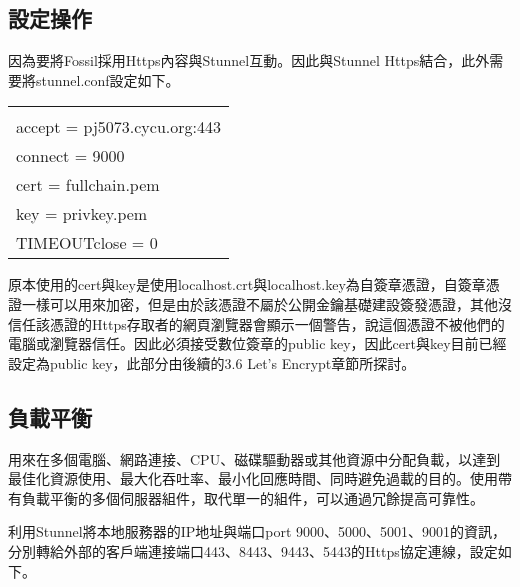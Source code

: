 \renewcommand{\baselinestretch}{20} %
\subsection{設定操作}
\par
\renewcommand{\baselinestretch}{1} %
\twelve \qquad 因為要將Fossil採用Https內容與Stunnel互動。因此與Stunnel Https結合，此外需要將stunnel.conf設定如下。
\\
\par
\begin{center}
\begin{tabular}{||p{15cm}|} %
\hline
[https]
\\
accept = pj5073.cycu.org:443
\\
connect = 9000
\\
cert = fullchain.pem
\\
key = privkey.pem
\\
TIMEOUTclose = 0
\\
\hline
\end{tabular}
\end{center}
\par
\renewcommand{\baselinestretch}{1} %
\twelve \hspace{0.5em} 原本使用的cert與key是使用localhost.crt與localhost.key為自簽章憑證，自簽章憑證一樣可以用來加密，但是由於該憑證不屬於公開金鑰基礎建設簽發憑證，其他沒信任該憑證的Https存取者的網頁瀏覽器會顯示一個警告，說這個憑證不被他們的電腦或瀏覽器信任。因此必須接受數位簽章的public key，因此cert與key目前已經設定為public key，此部分由後續的3.6 Let's Encrypt章節所探討。
\par

\renewcommand{\baselinestretch}{20} %
\subsection{負載平衡}
\par
\renewcommand{\baselinestretch}{1} %
\twelve \qquad 用來在多個電腦、網路連接、CPU、磁碟驅動器或其他資源中分配負載，以達到最佳化資源使用、最大化吞吐率、最小化回應時間、同時避免過載的目的。使用帶有負載平衡的多個伺服器組件，取代單一的組件，可以通過冗餘提高可靠性。
\\
\par
\renewcommand{\baselinestretch}{1} %
\twelve \hspace{0.5em} 利用Stunnel將本地服務器的IP地址與端口port 9000、5000、5001、9001的資訊，分別轉給外部的客戶端連接端口443、8443、9443、5443的Https協定連線，設定如下。


